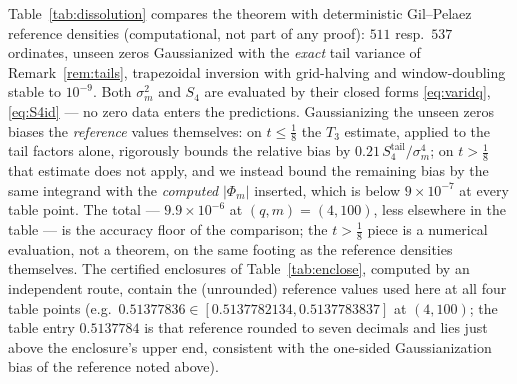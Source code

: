 \begin{remark}\label{rem:dissolution-numerics}
Table~\ref{tab:dissolution} compares the theorem with deterministic
Gil--Pelaez reference densities (computational, not part of any
proof): $511$ resp.\ $537$ ordinates, unseen zeros Gaussianized with
the \emph{exact} tail variance of Remark~\ref{rem:tails}, trapezoidal
inversion with grid-halving and window-doubling stable to
$10^{-9}$. Both $\sigma_m^2$ and $S_4$ are evaluated by their closed
forms \eqref{eq:varidq}, \eqref{eq:S4id} --- no zero data enters the
predictions. Gaussianizing the unseen zeros biases the \emph{reference}
values themselves: on $t\le\tfrac18$ the $T_3$ estimate, applied to
the tail factors alone, rigorously bounds the relative bias by
$0.21\,S_4^{\mathrm{tail}}/\sigma_m^4$; on $t>\tfrac18$ that estimate
does not apply, and we instead bound the remaining bias by the same
integrand with the \emph{computed} $|\Phi_m|$ inserted, which is below
$9\times10^{-7}$ at every table point. The total ---
$9.9\times10^{-6}$ at $(q,m)=(4,100)$, less elsewhere in the table ---
is the accuracy floor of the comparison; the $t>\tfrac18$ piece is a
numerical evaluation, not a theorem, on the same footing as the
reference densities themselves. The certified enclosures of Table~\ref{tab:enclose},
computed by an independent route, contain the (unrounded) reference
values used here at all four table points (e.g.\
$0.51377836\in[0.5137782134,0.5137783837]$ at $(4,100)$; the table
entry $0.5137784$ is that reference rounded to seven decimals and lies
just above the enclosure's upper end, consistent with the one-sided
Gaussianization bias of the reference noted above).


\end{remark}
